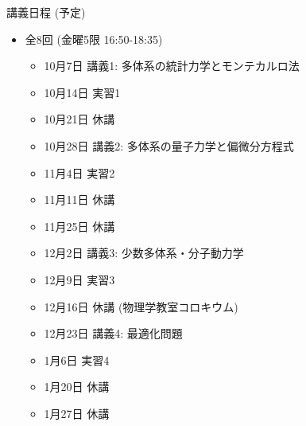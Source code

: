 \begin{frame}[t]{講義日程 (予定)}
  \begin{itemize}
  \item 全8回 (金曜5限 16:50-18:35)
    \begin{itemize}
    \item 10月7日 講義1: 多体系の統計力学とモンテカルロ法
    \item 10月14日 実習1
    \item {\color{gray} 10月21日 休講}
    \item 10月28日 講義2: 多体系の量子力学と偏微分方程式
    \item 11月4日 実習2
    \item {\color{gray} 11月11日 休講}
    \item {\color{gray} 11月25日 休講}
    \item 12月2日 講義3: 少数多体系・分子動力学
    \item 12月9日 実習3
    \item {\color{gray} 12月16日 休講 (物理学教室コロキウム)}
    \item 12月23日 講義4: 最適化問題
    \item 1月6日 実習4
    \item {\color{gray} 1月20日 休講}
    \item {\color{gray} 1月27日 休講}
    \end{itemize}
  \end{itemize}
\end{frame}

